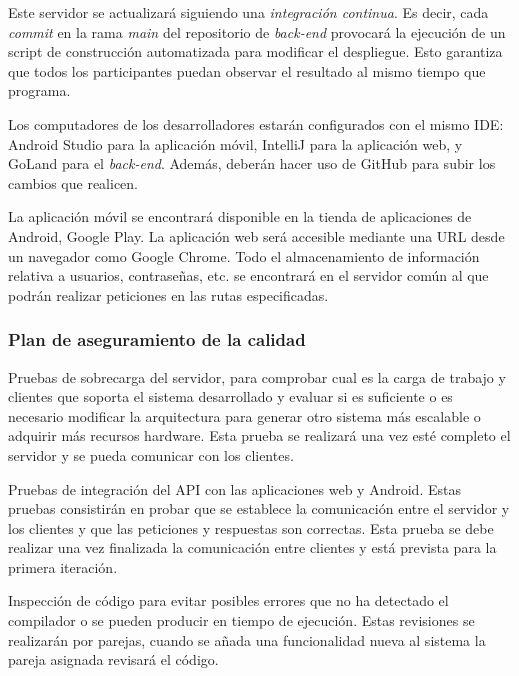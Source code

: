 \documentclass{article}
\begin{document}
Este servidor se actualizará siguiendo una \emph{integración continua}. Es decir, cada \textit{commit} en la rama \textit{main} del repositorio de \textit{back-end} provocará la ejecución de un script de construcción automatizada para modificar el despliegue. Esto garantiza que todos los participantes puedan observar el resultado al mismo tiempo que programa.

Los computadores de los desarrolladores estarán configurados con el mismo IDE: Android Studio para la aplicación móvil, IntelliJ para la aplicación web, y GoLand para el \textit{back-end}. Además, deberán hacer uso de GitHub para subir los cambios que realicen.

La aplicación móvil se encontrará disponible en la tienda de aplicaciones de Android, Google Play. La aplicación web será accesible mediante una URL desde un navegador como Google Chrome. Todo el almacenamiento de información relativa a usuarios, contraseñas, etc. se encontrará en el servidor común al que podrán realizar peticiones en las rutas especificadas.


\subsubsection{Plan de aseguramiento de la calidad}

Pruebas de sobrecarga del servidor, para comprobar cual es la carga de trabajo y clientes que soporta el sistema desarrollado y evaluar si es suficiente o es necesario modificar la arquitectura para generar otro sistema más escalable o adquirir más recursos hardware. Esta prueba se realizará una vez esté completo el servidor y se pueda comunicar con los clientes.

Pruebas de integración del API con las aplicaciones web y Android. Estas pruebas consistirán en probar que se establece la comunicación entre el servidor y los clientes y que las peticiones y respuestas son correctas. Esta prueba se debe realizar una vez finalizada la comunicación entre clientes y está prevista para la primera iteración.

Inspección de código para evitar posibles errores que no ha detectado el compilador o se pueden producir en tiempo de ejecución. Estas revisiones se realizarán por parejas, cuando se añada una funcionalidad nueva al sistema la pareja asignada revisará el código.
\end{document}
